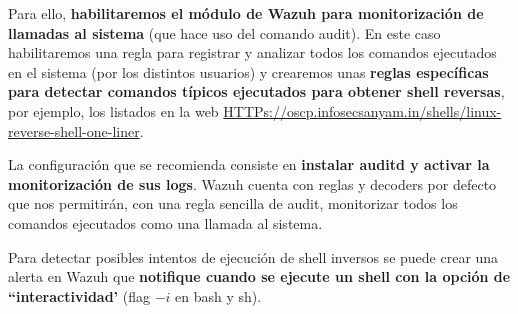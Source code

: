Para ello, \textbf{habilitaremos el módulo de Wazuh para monitorización de llamadas al sistema} (que hace uso del comando audit). En este caso habilitaremos una regla para registrar y analizar todos los comandos ejecutados en el sistema (por los distintos usuarios) y crearemos unas \textbf{reglas específicas para detectar comandos típicos ejecutados para obtener shell reversas}, por ejemplo, los listados en la web \url{HTTPs://oscp.infosecsanyam.in/shells/linux-reverse-shell-one-liner}.

La configuración que se recomienda consiste en \textbf{instalar auditd y activar la monitorización de sus logs}. Wazuh cuenta con reglas y decoders por defecto que nos permitirán, con una regla sencilla de audit, monitorizar todos los comandos ejecutados como una llamada al sistema. 

Para detectar posibles intentos de ejecución de shell inversos se puede crear una alerta en Wazuh que \textbf{notifique cuando se ejecute un shell con la opción de ``interactividad'} (flag $-i$ en bash y sh). 


